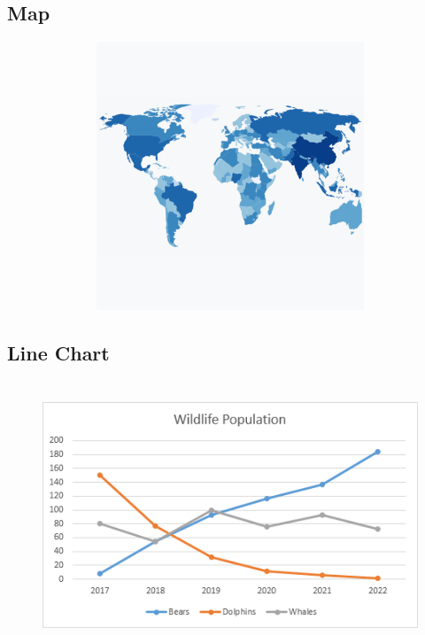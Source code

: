 \documentclass[12pt]{article}
\begin{document}
\subsection*{Map}
\begin{figure}[h]
    \centering
    \includegraphics[width=12cm, height=8cm]{choropleth_basic.png}
    \centering
\end{figure}

\subsection*{Line Chart}
\begin{figure}[h]
    \centering
    \includegraphics[width=12cm, height=8cm]{line-chart.png}
    \centering
\end{figure}

\newpage
\end{document}
